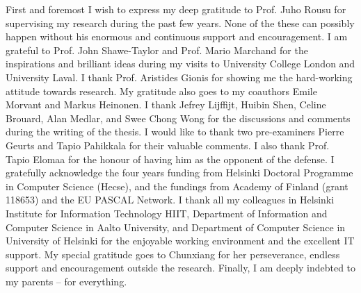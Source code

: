 

\begin{preface}[Espoo]

%
First and foremost I wish to express my deep gratitude to Prof. Juho Rousu for supervising my research during the past few years.
None of the these can possibly happen without his enormous and continuous support and encouragement.
%
I am grateful to Prof. John Shawe-Taylor and Prof. Mario Marchand for the inspirations and brilliant ideas during my visits to University College London and University Laval.
%
I thank Prof. Aristides Gionis for showing me the hard-working attitude towards research.
My gratitude also goes to my coauthors Emile Morvant and Markus Heinonen. 
%
I thank Jefrey Lijffijt, Huibin Shen, Celine Brouard, Alan Medlar, and Swee Chong Wong for the discussions and comments during the writing of the thesis.
I would like to thank two pre-examiners Pierre Geurts and Tapio Pahikkala for their valuable comments.
I also thank Prof. Tapio Elomaa for the honour of having him as the opponent of the defense.
%
I gratefully acknowledge the four years funding from Helsinki Doctoral Programme in Computer Science (Hecse), and the fundings from Academy of Finland (grant 118653) and the EU PASCAL Network.
% 
I thank all my colleagues in Helsinki Institute for Information Technology HIIT, Department of Information and Computer Science in Aalto University, and Department of Computer Science in University of Helsinki for the enjoyable working environment and the excellent IT support.
%
My special gratitude goes to Chunxiang for her perseverance, endless support and encouragement outside the research.
%
Finally, I am deeply indebted to my parents -- for everything.


\end{preface}
